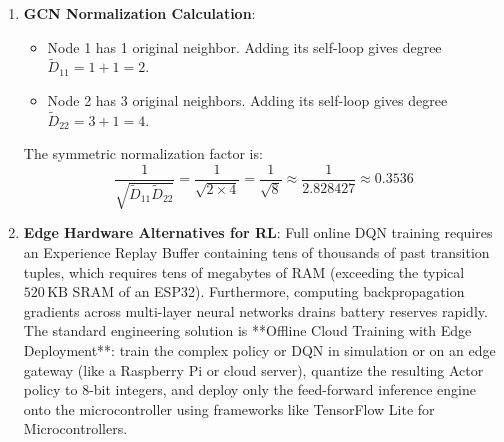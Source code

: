\begin{enumerate}
    \item \textbf{GCN Normalization Calculation}:
    \begin{itemize}
        \item Node 1 has 1 original neighbor. Adding its self-loop gives degree $\tilde{D}_{11} = 1 + 1 = 2$.
        \item Node 2 has 3 original neighbors. Adding its self-loop gives degree $\tilde{D}_{22} = 3 + 1 = 4$.
    \end{itemize}
    The symmetric normalization factor is:
    \begin{equation*}
    \frac{1}{\sqrt{\tilde{D}_{11}\tilde{D}_{22}}} = \frac{1}{\sqrt{2 \times 4}} = \frac{1}{\sqrt{8}} \approx \frac{1}{2.828427} \approx \mathbf{0.3536}
    \end{equation*}

    \item \textbf{Edge Hardware Alternatives for RL}:
    Full online DQN training requires an Experience Replay Buffer containing tens of thousands of past transition tuples, which requires tens of megabytes of RAM (exceeding the typical $520\,\text{KB}$ SRAM of an ESP32). Furthermore, computing backpropagation gradients across multi-layer neural networks drains battery reserves rapidly. The standard engineering solution is **Offline Cloud Training with Edge Deployment**: train the complex policy or DQN in simulation or on an edge gateway (like a Raspberry Pi or cloud server), quantize the resulting Actor policy to 8-bit integers, and deploy only the feed-forward inference engine onto the microcontroller using frameworks like TensorFlow Lite for Microcontrollers.
\end{enumerate}
